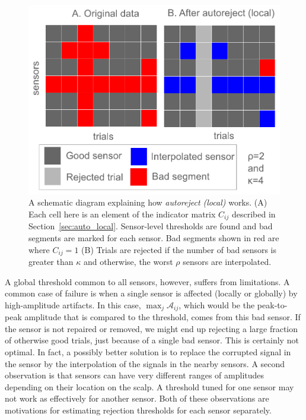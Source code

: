 \begin{figure}[t]
	\centering
	\includegraphics[width=0.65\linewidth]{figures/figure3.pdf}
    \caption[A schematic diagram explaining how \emph{autoreject (local)} works.]{A schematic diagram explaining how \emph{autoreject (local)} works. (A) Each cell here is an element of the indicator matrix $C_{ij}$ described in Section~\ref{sec:auto_local}. Sensor-level thresholds are found and bad segments are marked for each sensor. Bad segments shown in red are where $C_{ij}=1$ (B) Trials are rejected if the number of bad sensors is greater than $\kappa$ and otherwise, the worst $\rho$ sensors are interpolated.}
    \label{fig:schematic}
\end{figure}

A global threshold common to all sensors, however, suffers from limitations. A common case of failure is when a single sensor is affected (locally or globally) by high-amplitude artifacts. In this case, $\max_{j} \mathcal{A}_{ij}$, which would be the peak-to-peak amplitude that is compared to the threshold, comes from this bad sensor. If the sensor is not repaired or removed, we might end up rejecting a large fraction of otherwise good trials, just because of a single bad sensor. This is certainly not optimal. In fact, a possibly better solution is to replace the corrupted signal in the sensor by the interpolation of the signals in the nearby sensors. A second observation is that sensors can have very different ranges of amplitudes depending on their location on the scalp. A threshold tuned for one sensor may not work as effectively for another sensor. Both of these observations are motivations for estimating rejection thresholds for each sensor separately.

